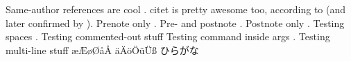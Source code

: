 \documentclass{article}
\begin{document}
Same-author references are cool \citep{foo2010, foo2011lorem, foo2011ipsum, foo2012, foo2011dolor, bar2013}.
citet is pretty awesome too, according to \citet[post]{foo2010} (and later confirmed by \cite{bar2013}).
Prenote only \citep[e.g.][]{foo2011lorem}.
Pre- and postnote \citep[e.g.][and references therein]{foo2011ipsum, foo2011dolor}.
Postnote only \citep[and references therein]{foo2010}.
Testing spaces \citep [pre] [post] {foo2011lorem, bar2013}.
Testing commented-out stuff %
Testing command inside args \citep[\odot$\dot{T}$][\odot$\dot{T}$]{foo2010}.
Testing multi-line stuff \citep{foo2010, foo2011dolor,
bar2013}
æÆøØåÅ äÄöÖüÜß ひらがな

\end{document}
